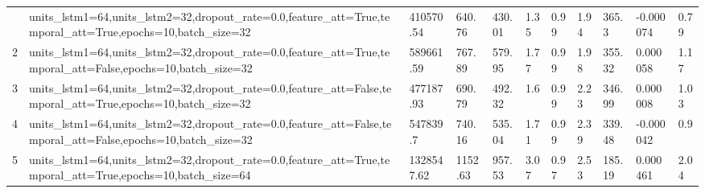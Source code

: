 \begin{longtable}{C{0.8cm} L{2cm} C{1.15cm} C{1.15cm} C{1.15cm} C{1.15cm} C{0.85cm} C{1.25cm} C{1.2cm} C{1.5cm} C{1.0cm}}
\bottomrule
{} & units\_lstm1=64,\newline units\_lstm2=32,\newline dropout\_rate=0.0,\newline feature\_att=True,\newline temporal\_att=True,\newline epochs=10,\newline batch\_size=32 & 410570.54 & 640.76 & 430.01 & 1.35 & 0.99 & 1.94 & 365.3 & -0.000074 & 0.79 \\
2 & units\_lstm1=64,\newline units\_lstm2=32,\newline dropout\_rate=0.0,\newline feature\_att=True,\newline temporal\_att=False,\newline epochs=10,\newline batch\_size=32 & 589661.59 & 767.89 & 579.95 & 1.77 & 0.99 & 1.98 & 355.32 & 0.000058 & 1.17 \\
3 & units\_lstm1=64,\newline units\_lstm2=32,\newline dropout\_rate=0.0,\newline feature\_att=False,\newline temporal\_att=True,\newline epochs=10,\newline batch\_size=32 & 477187.93 & 690.79 & 492.32 & 1.6 & 0.99 & 2.23 & 346.99 & 0.000008 & 1.03 \\
4 & units\_lstm1=64,\newline units\_lstm2=32,\newline dropout\_rate=0.0,\newline feature\_att=False,\newline temporal\_att=False,\newline epochs=10,\newline batch\_size=32 & 547839.7 & 740.16 & 535.04 & 1.71 & 0.99 & 2.39 & 339.48 & -0.000042 & 0.9 \\
5 & units\_lstm1=64,\newline units\_lstm2=32,\newline dropout\_rate=0.0,\newline feature\_att=True,\newline temporal\_att=True,\newline epochs=10,\newline batch\_size=64 & 1328547.62 & 1152.63 & 957.53 & 3.07 & 0.97 & 2.53 & 185.19 & 0.000461 & 2.04 \\

\end{longtable}
